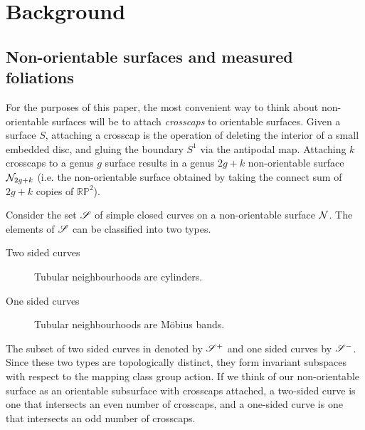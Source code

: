 \documentclass[12pt, reqno]{amsart}
\begin{document}

\section{Background}
\label{sec:background}

\subsection{Non-orientable surfaces and measured foliations}
\label{sec:backgr-meas-foli}

For the purposes of this paper, the most convenient way to think about non-orientable surfaces will be to attach \emph{crosscaps} to orientable surfaces.
Given a surface $S$, attaching a crosscap is the operation of deleting the interior of a small embedded disc, and gluing the boundary $S^1$ via the antipodal map.
Attaching $k$ crosscaps to a genus $g$ surface results in a genus $2g+k$ non-orientable surface $\mathcal{N}_{2g+k}$ (i.e. the non-orientable surface obtained by taking the connect sum of $2g+k$ copies of $\mathbb{RP}^2$).

Consider the set $\mathscr{S}$ of simple closed curves on a non-orientable surface $\mathcal{N}$.
The elements of $\mathscr{S}$ can be classified into two types.
\begin{description}
\item[Two sided curves] Tubular neighbourhoods are cylinders.
\item[One sided curves] Tubular neighbourhoods are Möbius bands.
\end{description}
The subset of two sided curves in denoted by $\mathscr{S}^+$ and one sided curves by $\mathscr{S}^-$.
Since these two types are topologically distinct, they form invariant subspaces with respect to the mapping class group action.
If we think of our non-orientable surface as an orientable subsurface with crosscaps attached, a two-sided curve is one that intersects an even number of crosscaps, and a one-sided curve is one that intersects an odd number of crosscaps.
\end{document}
